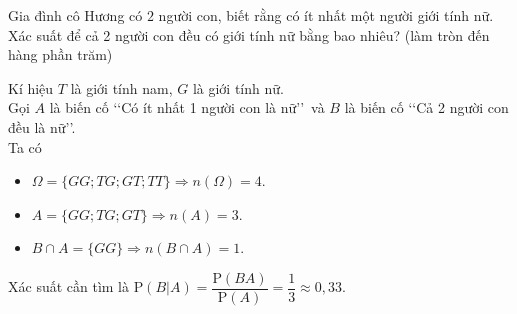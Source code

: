 \begin{bt}%
	Gia đình cô Hương có $2$ người con, biết rằng có ít nhất một người giới tính nữ. Xác suất để cả 2 người con đều có giới tính nữ bằng bao nhiêu? (làm tròn đến hàng phần trăm)
	\loigiai
	{
		Kí hiệu $T$ là giới tính nam, $G$ là giới tính nữ.\\
		Gọi $A$ là biến cố \lq\lq Có ít nhất 1 người con là nữ\rq\rq\ và $B$ là biến cố \lq\lq Cả 2 người con đều là nữ\rq\rq.\\ Ta có
		\begin{itemize}
			\item $\Omega= \{GG; TG; GT; TT\} \Rightarrow n(\Omega)= 4$.
			\item $A= \{GG; TG; GT\} \Rightarrow n(A)=3$.
			\item $B\cap A=\{GG\} \Rightarrow n(B \cap A)=1$.
		\end{itemize}		
		Xác suất cần tìm là $\mathrm{P}(B|A)= \dfrac{\mathrm{P}(BA)}{\mathrm{P}(A)}= \dfrac{1}{3}\approx 0{,}33$.
	}
\end{bt}

